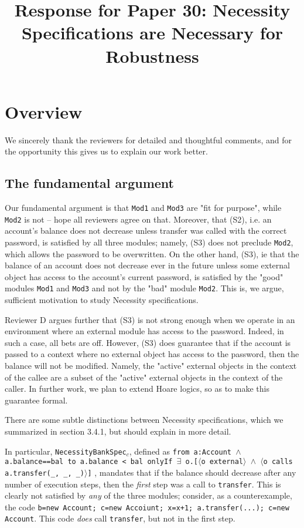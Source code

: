 \documentclass[11pt]{amsart}
\title{Response for Paper 30: Necessity Specifications are Necessary for Robustness }
\newcommand{\prg}[1]{\texttt{#1}}
\begin{document}
\maketitle
\section{Overview}
We sincerely thank the reviewers for detailed and thoughtful comments, and for the opportunity this gives us to explain our work better. 



\subsection*{The fundamental argument}

Our fundamental argument is that \prg{Mod1} and \prg{Mod3} are "fit for purpose", while \prg{Mod2} is not -- hope all reviewers agree on that.
Moreover, that (S2), i.e. an account's balance does not decrease unless transfer was called with the correct password, is satisfied by all three modules; namely, (S3) does not preclude \prg{Mod2}, which allows the password to be overwritten. On the other hand, (S3), ie that the balance of an account does not decrease ever in the future unless some external object has access to the account's current password, is satisfied by the "good" modules \prg{Mod1} and \prg{Mod3} and not by the "bad" module \prg{Mod2}. This is, we argue, sufficient motivation to study Necessity specifications. 

Reviewer D argues further that (S3) is not strong enough when we operate in an environment where an external module has access to the password. Indeed, in such a case, all bets are off. However, (S3) does guarantee that if the account is passed to a context where no external object has access to the password, then the balance will not be modified. Namely, the "active" external objects  in the context of the callee are a subset of the "active" external objects  in the context of the caller.  In further work, we plan to extend Hoare logics, so as to make this guarantee formal.

There are some subtle distinctions between Necessity specifications, which we summarized in section 3.4.1, but should explain in more detail. 

In particular, \prg{NecessityBankSpec}$_c$, defined as 
\texttt{from a:Account $\wedge$ a.balance==bal to a.balance < bal
 onlyIf $\exists$ o.[$\langle$o external$\rangle$ $\wedge$ $\langle$o calls a.transfer(\_, \_, \_)$\rangle$]}
, mandates that if the balance should decrease after any number of execution steps, then the \emph{first} step was a call  to \prg{transfer}. This is clearly not satisfied by \emph{any} of the three modules; consider, as a counterexample, the code \prg{b=new Account; c=new Accoiunt; x=x+1; a.transfer(...); c=new Account}. This code \emph{does} call \prg{transfer}, but not in the first step.
\end{document}
